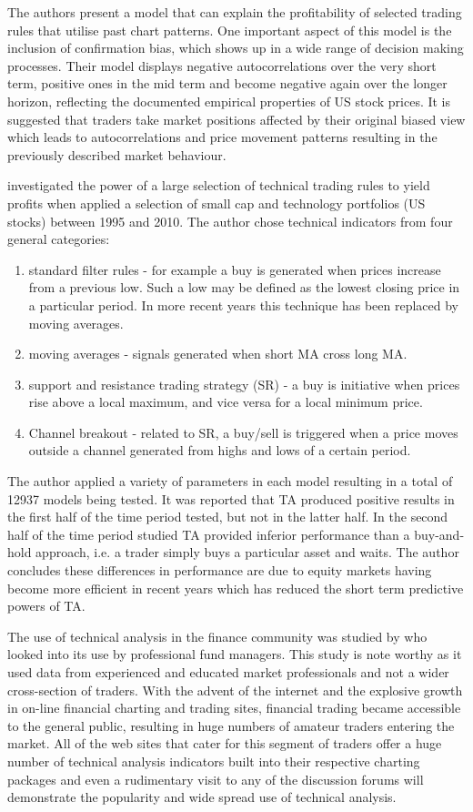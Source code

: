 The authors present a model that can explain the profitability of selected trading rules that utilise past chart patterns. One important aspect of this model is the inclusion of confirmation bias, which shows up in a wide range of decision making processes. Their model displays negative autocorrelations over the very short term, positive ones in the
mid term and become negative again over the longer horizon, reflecting the documented empirical properties of US stock prices.  It is suggested that traders take market positions affected by their original biased view which leads to autocorrelations and price movement patterns resulting in the previously described market behaviour.

\cite{Shynkevich2012193} investigated the power of a large selection of technical trading rules to yield profits when applied a selection of small cap and technology portfolios (US stocks) between 1995 and 2010. The author chose technical indicators from four general categories:
\begin{enumerate}
\item standard filter rules - for example a buy is generated when prices increase from a previous low. Such a low may be defined as the lowest closing price in a particular period. In more recent years this technique has been replaced by moving averages. 
\item  moving averages - signals generated when short MA cross long MA. 
\item  support and resistance trading strategy (SR) - a buy is initiative when prices rise above a local maximum, and vice versa for a local minimum price.
\item  Channel breakout - related to SR, a buy/sell is triggered when a price moves outside a channel generated from highs and lows of a certain period.
\end{enumerate}
The author applied a variety of parameters in each model resulting in a total of 12937 models being tested. It was reported that TA produced positive results in the first half of the time period tested, but not in the latter half. In the second half of the time period studied TA provided inferior performance than a buy-and-hold approach, i.e. a trader simply buys a particular asset and waits. The author concludes these differences in performance are due to equity markets having become more efficient in recent years which has reduced the short term predictive powers of TA.

The use of technical analysis in the finance community was studied by \cite{Menkhoff20102573} who looked into its use by professional fund managers. This study is note worthy as it used data from experienced and educated market professionals and not a wider cross-section of traders. With the advent of the internet and the explosive growth in on-line financial charting and trading sites, financial  trading became accessible to the general public, resulting in huge numbers of amateur traders entering the market. All of the web sites that cater for this segment of traders offer a huge number of technical analysis indicators built into their respective charting packages and even a rudimentary visit to any of the discussion forums will demonstrate the popularity and wide spread use of technical analysis. 
 
